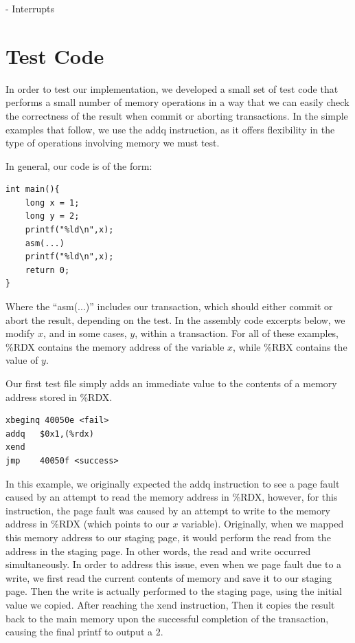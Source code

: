 \documentclass{acm_proc_article-sp}
\begin{document}
- Interrupts

\section{Test Code}

In order to test our implementation, we developed a small set of test code that
performs a small number of memory operations in a way that we can easily check
the correctness of the result when commit or aborting transactions. 
In the simple examples that follow, we use the addq instruction, as it
offers flexibility in the type of operations involving memory we must test.

In general, our code is of the form:
\begin{verbatim}
int main(){
    long x = 1;
    long y = 2;
    printf("%ld\n",x);  
    asm(...)
    printf("%ld\n",x);  
    return 0;
}
\end{verbatim} 

Where the ``asm(...)'' includes our transaction, which should either commit or
abort the result, depending on the test. In the assembly code excerpts below,
we modify $x$, and in some cases, $y$, within a transaction.  For all of these
examples, \%RDX contains the memory address of the variable $x$, while \%RBX
contains the value of $y$.

Our first test file simply adds an immediate value to the contents of a memory
address stored in \%RDX.

\begin{verbatim}
xbeginq 40050e <fail>
addq   $0x1,(%rdx)
xend   
jmp    40050f <success>
\end{verbatim}

In this example, we originally expected the addq instruction to see a page
fault caused by an attempt to read the memory address in \%RDX, however, for
this instruction, the page fault was caused by an attempt to write to the
memory address in \%RDX (which points to our $x$ variable). Originally, when we
mapped this memory address to our staging page, it would perform the read from
the address in the staging page.  In other words, the read and write occurred
simultaneously.  In order to address this issue, even when we page fault due to
a write, we first read the current contents of memory and save it to our
staging page. Then the write is actually performed to the staging page, using
the initial value we copied.  After reaching the xend instruction,  Then it
copies the result back to the main memory upon the successful completion of the
transaction, causing the final printf to output a $2$.
\end{document}
